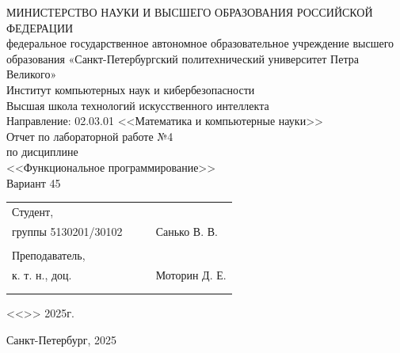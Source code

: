 \documentclass[a4paper, final]{article}
\begin{document}
\begin{center}
\hfill \break
\hfill \break
\normalsize{МИНИСТЕРСТВО НАУКИ И ВЫСШЕГО ОБРАЗОВАНИЯ РОССИЙСКОЙ ФЕДЕРАЦИИ\\
федеральное государственное автономное образовательное учреждение высшего образования «Санкт-Петербургский политехнический университет Петра Великого»\\[10pt]}
\normalsize{Институт компьютерных наук и кибербезопасности}\\[10pt] 
\normalsize{Высшая школа технологий искусственного интеллекта}\\[10pt] 
\normalsize{Направление: 02.03.01 <<Математика и компьютерные науки>>}\\

\hfill \break
\hfill \break
\hfill \break
\hfill \break
\large{Отчет по лабораторной работе №4}\\
\large{по дисциплине}\\
\large{<<Функциональное программирование>>}\\
\large{Вариант 45}\\
\hfill \break
\end{center}

\small{ 
\begin{tabular}{lrrl}
\!\!\!Студент, & \hspace{2cm} & & \\
\!\!\!группы 5130201/30102 & \hspace{2cm} & \underline{\hspace{3cm}} &Санько В. В. \\\\
\!\!\!Преподаватель,\\ \hspace{-5pt}к. т. н., доц. & \hspace{2cm} &  \underline{\hspace{3cm}} &  Моторин Д. Е. \\\\
&&\hspace{4cm}
\end{tabular}
\begin{flushright}
<<\underline{\hspace{1cm}}>>\underline{\hspace{2.5cm}} 2025г.
\end{flushright}
}

\hfill \break
\vspace{3cm}
\begin{center} \small{Санкт-Петербург, 2025} \end{center}
\thispagestyle{empty}
\end{document}
